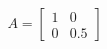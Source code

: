 \documentclass[preview]{standalone}
\begin{document}
\begin{align*}
A = \begin{bmatrix} 1 & 0 \\ 0 & 0.5 \end{bmatrix}
\end{align*}
\end{document}
